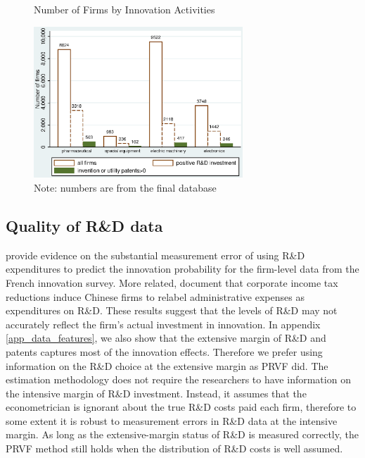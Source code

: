 \documentclass[11pt]{article}
\begin{document}
\begin{figure}[h]
    \caption{Number of Firms by Innovation Activities} 
    \label{F1}
    \begin{centering}
    \includegraphics[width=0.7\textwidth]{Figs/FirmsCount.eps}
    \par\end{centering}
    \caption*{\small{}Note: numbers are from the final database}{\small \par}
\end{figure}

\subsection{Quality of R\&D data}
\cite{mairesse2005} provide evidence on the substantial measurement error of using R\&D expenditures to predict the innovation probability for the firm-level data from the French innovation survey. More related, \cite{chen2017wp} document that corporate income tax reductions induce Chinese firms to relabel administrative expenses as expenditures on R\&D. These results suggest that the levels of R\&D may not accurately reflect the firm's actual investment in innovation. In appendix \ref{app_data_features}, we also show that the extensive margin of R\&D and patents captures most of the innovation effects. Therefore we prefer using information on the R\&D choice at the extensive margin as PRVF did. The estimation methodology does not require the researchers to have information on the intensive margin of R\&D investment. Instead, it assumes that the econometrician is ignorant about the true R\&D costs paid each firm, therefore to some extent it is robust to measurement errors in R\&D data at the intensive margin. As long as the extensive-margin status of R\&D is measured correctly, the PRVF method still holds when the distribution of R\&D costs is well assumed. 
\end{document}

